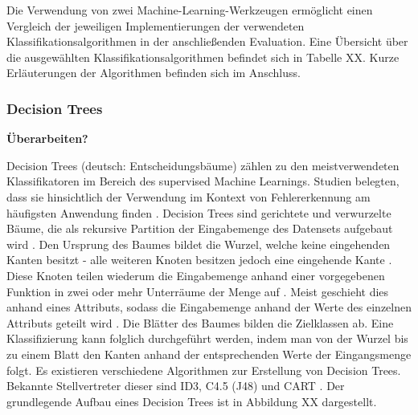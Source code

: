Die Verwendung von zwei Machine-Learning-Werkzeugen ermöglicht einen Vergleich der jeweiligen Implementierungen der verwendeten Klassifikationsalgorithmen in der anschließenden Evaluation. Eine Übersicht über die ausgewählten Klassifikationsalgorithmen befindet sich in Tabelle XX. Kurze Erläuterungen der Algorithmen befinden sich im Anschluss.

\begin{table}
\centering
\caption{Zum Training verwendete Klassifikationsalgorithmen}
\label{tab:classifiers}
\end{table}

\label{algorithms}
\subsubsection*{Decision Trees}

\textbf{Überarbeiten?}

Decision Trees (deutsch: Entscheidungsbäume) zählen zu den meistverwendeten Klassifikatoren im Bereich des supervised Machine Learnings. Studien belegten, dass sie hinsichtlich der Verwendung im Kontext von Fehlererkennung am häufigsten Anwendung finden \cite{Son2019}. Decision Trees sind gerichtete und verwurzelte Bäume, die als rekursive Partition der Eingabemenge des Datensets aufgebaut wird \cite{Rokach2005}. Den Ursprung des Baumes bildet die Wurzel, welche keine eingehenden Kanten besitzt - alle weiteren Knoten besitzen jedoch eine eingehende Kante \cite{Rokach2005}. Diese Knoten teilen wiederum die Eingabemenge anhand einer vorgegebenen Funktion in zwei oder mehr Unterräume der Menge auf \cite{Rokach2005}. Meist geschieht dies anhand eines Attributs, sodass die Eingabemenge anhand der Werte des einzelnen Attributs geteilt wird \cite{Rokach2005}. Die Blätter des Baumes bilden die Zielklassen ab. Eine Klassifizierung kann folglich durchgeführt werden, indem man von der Wurzel bis zu einem Blatt den Kanten anhand der entsprechenden Werte der Eingangsmenge folgt. Es existieren verschiedene Algorithmen zur Erstellung von Decision Trees. Bekannte Stellvertreter dieser sind ID3, C4.5 (J48) und CART \cite{Rokach2005}. Der grundlegende Aufbau eines Decision Trees ist in Abbildung XX dargestellt.

